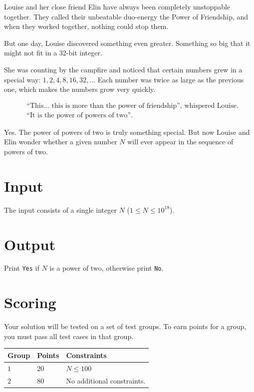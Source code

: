 
Louise and her close friend Elin have always been completely unstoppable together.
They called their unbeatable duo-energy the Power of Friendship, and when they worked together, nothing could stop them.

But one day, Louise discovered something even greater. Something so big that it might not fit in a 32-bit integer.

She was counting by the campfire and noticed that certain numbers grew in a special way: $1, 2, 4, 8, 16, 32, \dots$  
Each number was twice as large as the previous one, which makes the numbers grow very quickly.

\begin{align*}
& \text{``This... this is more than the power of friendship'', whispered Louise.} \\
& \text{``It is the power of powers of two''.}
\end{align*}

Yes. The power of powers of two is truly something special. But now Louise and Elin wonder whether a given number $N$ will ever appear in the sequence of powers of two.

\section*{Input}
The input consists of a single integer $N$ ($1 \leq N \leq 10^{18}$).

\section*{Output}
Print \verb|Yes| if $N$ is a power of two, otherwise print \verb|No|.

\section*{Scoring}
Your solution will be tested on a set of test groups.
To earn points for a group, you must pass all test cases in that group.

\noindent
\begin{tabular}{| l | l | p{12cm} |}
  \hline
  \textbf{Group} & \textbf{Points} & \textbf{Constraints} \\ \hline
  $1$    & $20$  & $N \le 100$ \\ \hline
  $2$    & $80$  & No additional constraints. \\ \hline
\end{tabular}
